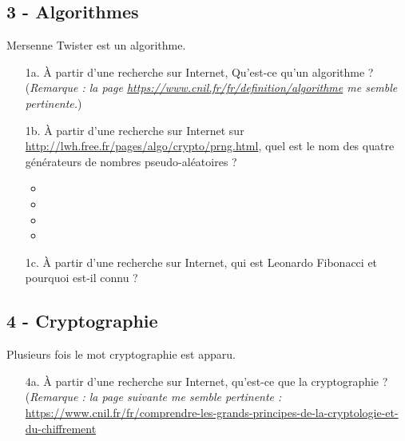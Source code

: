 \newpage

\subsection*{3 - Algorithmes}

Mersenne Twister est un algorithme. 

\begin{enumerate}
    \item[1a.] À partir d'une recherche sur Internet, Qu’est-ce qu'un algorithme ? \\
    (\textit{Remarque : la page \url{https://www.cnil.fr/fr/definition/algorithme} me semble pertinente.}) \\
    \Pointilles[8]

    \item[1b.] À partir d'une recherche sur Internet sur \url{http://lwh.free.fr/pages/algo/crypto/prng.html}, quel est le nom des quatre générateurs de nombres pseudo-aléatoires ?
    
    \begin{itemize}[label={$\bullet$}]
        \item \dotfill
        \item \dotfill
        \item \dotfill
        \item \dotfill
    \end{itemize} 

    \item[1c.] À partir d'une recherche sur Internet, qui est Leonardo Fibonacci et pourquoi est-il connu ? \\ \Pointilles[8]
\end{enumerate} 

\subsection*{4 - Cryptographie}

Plusieurs fois le mot cryptographie est apparu. 

\begin{enumerate}
    \item[4a.] À partir d'une recherche sur Internet, qu'est-ce que la cryptographie ? \\

(\textit{Remarque : la page suivante me semble pertinente :} \\
\url{https://www.cnil.fr/fr/comprendre-les-grands-principes-de-la-cryptologie-et-du-chiffrement} \\ \Pointilles[6]
\end{enumerate} 

